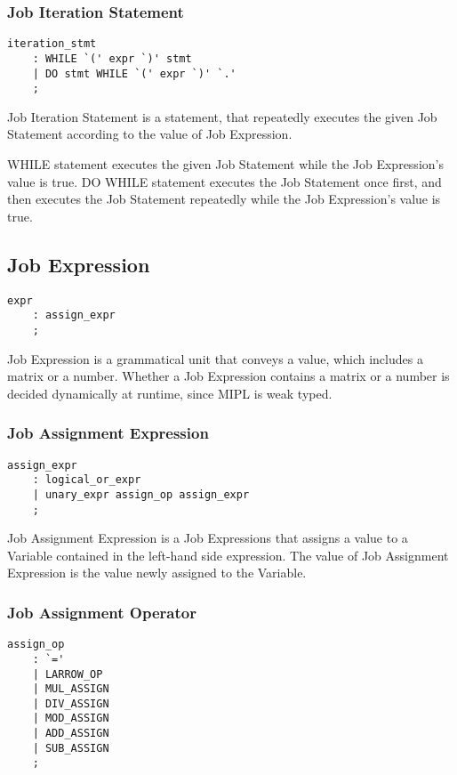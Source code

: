\documentclass[prodmode,acmtecs]{acmsmall}
\begin{document}
\subsubsection{Job Iteration Statement}

\begin{lstlisting}
iteration_stmt
	: WHILE `(' expr `)' stmt
	| DO stmt WHILE `(' expr `)' `.'
	;
\end{lstlisting}

Job Iteration Statement is a statement, that repeatedly executes
the given Job Statement according to the value of Job Expression.

WHILE statement executes the given Job Statement while the Job
Expression's value is true.  DO WHILE statement executes the Job
Statement once first, and then executes the Job Statement repeatedly
while the Job Expression's value is true.


\subsection{Job Expression}

\begin{lstlisting}
expr
	: assign_expr
	;
\end{lstlisting}

Job Expression is a grammatical unit that conveys a value, which
includes a matrix or a number.  Whether a Job Expression contains
a matrix or a number is decided dynamically at runtime, since MIPL
is weak typed.


\subsubsection{Job Assignment Expression}

\begin{lstlisting}
assign_expr
	: logical_or_expr
	| unary_expr assign_op assign_expr
	;
\end{lstlisting}

Job Assignment Expression is a Job Expressions that assigns a value
to a Variable contained in the left-hand side expression.  The value
of Job Assignment Expression is the value newly assigned to the
Variable.


\subsubsection{Job Assignment Operator}

\begin{lstlisting}
assign_op
	: `='
	| LARROW_OP
	| MUL_ASSIGN
	| DIV_ASSIGN
	| MOD_ASSIGN
	| ADD_ASSIGN
	| SUB_ASSIGN
	;
\end{lstlisting}
\end{document}
